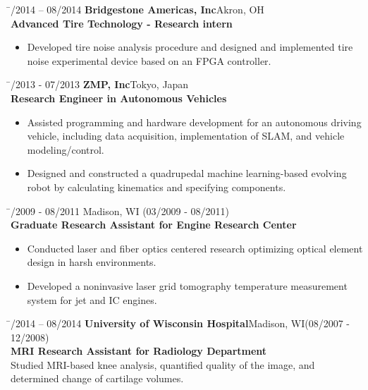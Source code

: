 \documentclass[11pt,letter]{article}
\begin{document}
\begin{tabbing}
	\hspace{3cm} \= /2014 -- 08/2014 \> {\bf Bridgestone Americas, Inc}\hfill{Akron, OH}\\
	\> {\bf Advanced Tire Technology - Research intern}\\
	\> \begin{minipage}{0.8\textwidth}
		\begin{itemize}
			\item Developed tire noise analysis procedure and designed and implemented tire noise experimental device based on an FPGA controller.
		\end{itemize}
	\end{minipage}
\end{tabbing}
\begin{tabbing}
	\hspace{3cm} \= /2013 - 07/2013 \> {\bf ZMP, Inc}\hfill{Tokyo, Japan }\\
	\> {\bf Research Engineer in Autonomous Vehicles}\\
	\> \begin{minipage}{0.8\textwidth}
		\begin{itemize}
			\item Assisted programming and hardware development for an autonomous driving vehicle, including data acquisition, implementation of SLAM, and vehicle modeling/control.
			\item Designed and constructed a quadrupedal machine learning-based evolving robot by calculating kinematics and specifying components.
		\end{itemize}
	\end{minipage}
\end{tabbing}
\begin{tabbing}
	\hspace{3cm} \= /2009 - 08/2011 \hfill{Madison, WI}{ (03/2009 - 08/2011)}\\
	 \> {\bf Graduate Research Assistant for Engine Research Center}\\
	 \> \begin{minipage}{0.8\textwidth}
	 	\begin{itemize}
	 		\item Conducted laser and fiber optics centered research optimizing optical element design in harsh environments.
	 		\item Developed a noninvasive laser grid tomography temperature measurement system for jet and IC engines.
	 	\end{itemize}
	 \end{minipage}
\end{tabbing}
\begin{tabbing}
	\hspace{3cm} \= /2014 -- 08/2014 \> {\bf University of Wisconsin Hospital}\hfill{Madison, WI}{ {(08/2007 - 12/2008)}}\\
	\> {\bf MRI Research Assistant for Radiology Department}\\
	\> Studied MRI-based knee analysis, quantified quality of the image, and determined change of cartilage volumes.
\end{tabbing}
\end{document}

